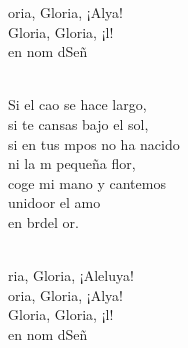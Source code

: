 \begin{cancion}
\begin{chorus}
	oria, Gloria, ¡Alya!\\
	Gloria, Gloria, ¡l!\\
	en nom dSeñ \\
	\end{chorus}%
	\jump\\
	Si el cao se hace largo,\\
si te cansas bajo el sol,\\
	si en tus mpos no ha nacido\\
	ni la m pequeña flor,\\
coge mi mano y cantemos\\
	unidoor el amo\\
	en brdel or. \\\jump\\
	\begin{chorus}%
	ria, Gloria, ¡Aleluya!\\
	oria, Gloria, ¡Alya!\\
	Gloria, Gloria, ¡l!\\
	en nom dSeñ \\
	\end{chorus}%
	\jump\\
\end{cancion}%
